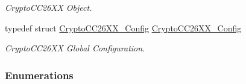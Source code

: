 \begin{DoxyCompactItemize}
\begin{DoxyCompactList}\small\item\em Crypto\-C\-C26\-X\-X Object. \end{DoxyCompactList}\item 
typedef struct \hyperlink{struct_crypto_c_c26_x_x___config}{Crypto\-C\-C26\-X\-X\-\_\-\-Config} \hyperlink{_crypto_c_c26_x_x_8h_a7ff3fbcb90bc60cea7c5a281d5c7add2}{Crypto\-C\-C26\-X\-X\-\_\-\-Config}
\begin{DoxyCompactList}\small\item\em Crypto\-C\-C26\-X\-X Global Configuration. \end{DoxyCompactList}\end{DoxyCompactItemize}
\subsubsection*{Enumerations}
